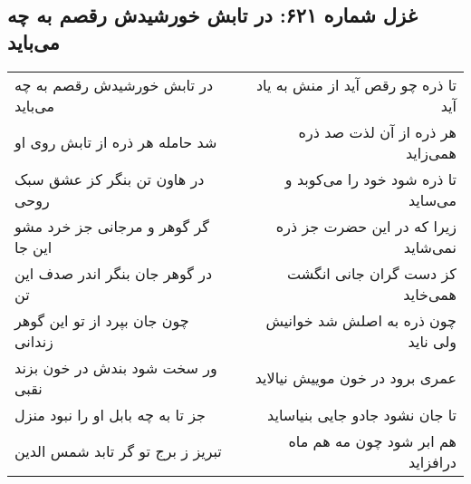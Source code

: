 \begin{center}
\section*{غزل شماره ۶۲۱: در تابش خورشیدش رقصم به چه می‌باید}
\label{sec:0621}
\begin{longtable}{l p{0.5cm} r}
در تابش خورشیدش رقصم به چه می‌باید
&&
تا ذره چو رقص آید از منش به یاد آید
\\
شد حامله هر ذره از تابش روی او
&&
هر ذره از آن لذت صد ذره همی‌زاید
\\
در هاون تن بنگر کز عشق سبک روحی
&&
تا ذره شود خود را می‌کوبد و می‌ساید
\\
گر گوهر و مرجانی جز خرد مشو این جا
&&
زیرا که در این حضرت جز ذره نمی‌شاید
\\
در گوهر جان بنگر اندر صدف این تن
&&
کز دست گران جانی انگشت همی‌خاید
\\
چون جان بپرد از تو این گوهر زندانی
&&
چون ذره به اصلش شد خوانیش ولی ناید
\\
ور سخت شود بندش در خون بزند نقبی
&&
عمری برود در خون موییش نیالاید
\\
جز تا به چه بابل او را نبود منزل
&&
تا جان نشود جادو جایی بنیاساید
\\
تبریز ز برج تو گر تابد شمس الدین
&&
هم ابر شود چون مه هم ماه درافزاید
\\
\end{longtable}
\end{center}
